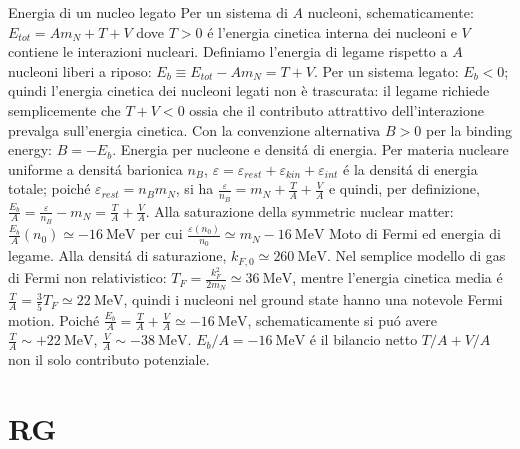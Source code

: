\begin{frame}{Energia di un nucleo legato}
Per un sistema di \(A\) nucleoni, schematicamente: $E_{tot}=A m_N + T + V$ dove $T>0$ \'e l'energia cinetica interna dei nucleoni e \(V\) contiene le interazioni nucleari. Definiamo l'energia di legame rispetto a \(A\) nucleoni liberi a riposo: $E_b\equiv E_{tot}-A m_N=T+V$. Per un sistema legato: $E_b<0$; quindi l'energia cinetica dei nucleoni legati non è trascurata: il legame richiede semplicemente che $T+V<0$ ossia che il contributo attrattivo dell'interazione prevalga sull'energia cinetica. Con la convenzione alternativa \(B>0\) per la binding energy: $B=-E_b$.
Energia per nucleone e densit\'a di energia. Per materia nucleare uniforme a densit\'a barionica \(n_B\), $\varepsilon=\varepsilon_{rest}+\varepsilon_{kin}+\varepsilon_{int}$ \'e la densit\'a di energia totale; poich\'e $\varepsilon_{rest}=n_B m_N$, si ha $\frac{\varepsilon}{n_B}=m_N+\frac{T}{A}+\frac{V}{A}$ e quindi, per definizione, $\frac{E_b}{A}=\frac{\varepsilon}{n_B}-m_N=\frac{T}{A}+\frac{V}{A}$. 
Alla saturazione della symmetric nuclear matter: $\frac{E_b}{A}(n_0)\simeq -16~\mathrm{MeV}$ per cui $\frac{\varepsilon(n_0)}{n_0}\simeq m_N-16~\mathrm{MeV}$
Moto di Fermi ed energia di legame. Alla densit\'a di saturazione, $k_{F,0}\simeq 260~\mathrm{MeV}$. Nel semplice modello di gas di Fermi non relativistico: $T_F=\frac{k_F^2}{2m_N}\simeq 36~\mathrm{MeV}$, mentre l'energia cinetica media \'e $\frac{T}{A}=\frac{3}{5}T_F\simeq 22~\mathrm{MeV}$, quindi i nucleoni nel ground state hanno una notevole Fermi motion.
Poich\'e $\frac{E_b}{A}=\frac{T}{A}+\frac{V}{A}\simeq -16~\mathrm{MeV}$, schematicamente si pu\'o avere $\frac{T}{A}\sim +22~\mathrm{MeV}$, $\frac{V}{A}\sim -38~\mathrm{MeV}$. $E_b/A=-16~\mathrm{MeV}$ \'e il bilancio netto $T/A+V/A$ non il solo contributo potenziale.
\end{frame}


\section{RG}

